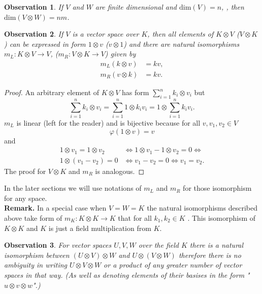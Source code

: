 \documentclass[a4paper, 12pt]{article}
\newtheorem{observation}{Observation}
\begin{document}
\begin{observation}
If $V$ and $W$ are finite dimensional and $\mathrm{ dim}(V)=n$, , then
$\mathrm{dim}(V \otimes W)=nm$.
\end{observation}

\begin{observation}\label{observation:2}
If $V$ is a vector space over $K$, then all elements of $K \otimes V$ ($V \otimes K$) can be expressed in
form $1 \otimes v$ ($v \otimes 1$) and there are natural isomorphisms $m_L : K \otimes V \to V$,
($m_R : V \otimes K \to V$) given by
\begin{align*}
m_L(k \otimes v) &= kv, \\
m_R(v \otimes k) &= kv.
\end{align*}
\end{observation}
\begin{proof}
An arbitrary element of $K \otimes V$ has form $\displaystyle\sum^n_{i=1}k_i \otimes v_i$ but
\begin{equation*}
\sum^n_{i=1}k_i \otimes v_i = \sum^n_{i=1} 1 \otimes k_iv_i = 1 \otimes \sum^n_{i=1}k_iv_i.
\end{equation*}
$m_L$ is linear (left for the reader) and is bijective because for all $v, v_1, v_2 \in V$
\begin{equation*}
\varphi(1 \otimes v) = v
\end{equation*}
and
\begin{align*}
1 \otimes v_1 = 1 \otimes v_2 &\iff 1 \otimes v_1 - 1 \otimes v_2 = 0 \iff \\
1 \otimes (v_1 - v_2) = 0 &\iff v_1 -v_2 = 0 \iff v_1 = v_2.
\end{align*}
The proof for $V \otimes K$ and $m_R$ is analogous.\end{proof}
 In the later sections we will use notations of
$m_L$ and $m_R$ for those isomorphism for any space. \\
\textbf{Remark. } In a special case when $V = W = K$ the natural isomorphisms described above
take form of $m_K : K \otimes K \to K$ that for all $k_1, k_2\in K$
. This isomorphism of $K \otimes K$ and $K$ is just a field
multiplication from $K$.
\begin{observation}
For vector spaces $U, V, W$ over the field $K$ there is a natural isomorphism between
$(U \otimes V) \otimes W$ and $U \otimes (V \otimes W)$ therefore there is no ambiguity in writing
$U \otimes V \otimes W$ or a product of any greater number of vector spaces in that way. (As well as denoting
elements of their basises in the form "$u \otimes v \otimes w$".)
\end{observation}
\end{document}
